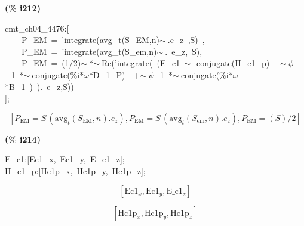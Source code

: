 \documentclass[fleqn]{article}
\begin{document}
\noindent
\begin{minipage}[t]{4.000000em}\color{red}\bfseries
(\% i212)	
\end{minipage}
\begin{minipage}[t]{\textwidth}\color{blue}
cmt\_ch04\_4476:[\\
\ \ \ \ P\_EM\ =\ 'integrate(avg\_t(S\_EM,n)\ensuremath{\sim\ }.e\_z\ ,S)\ ,\ \\
\ \ \ \ P\_EM\ =\ 'integrate(avg\_t(S\_em,n)\ensuremath{\sim\ }.\ e\_z,\ S),\ \\
\ \ \ \ P\_EM\ =\ (1/2)\ensuremath{\sim\ }*\ensuremath{\sim\ }Re('integrate(\ (E\_c1\ \ensuremath{\sim\ }\ conjugate(H\_c1\_p)\ +\ensuremath{\sim\ }\ensuremath{\phi}\_1\ *\ensuremath{\sim\ }conjugate(\%i*\ensuremath{\omega}*D\_1\_P)\ \ +\ensuremath{\sim\ }\ensuremath{\psi}\_1\ *\ensuremath{\sim\ }conjugate(\%i*\ensuremath{\omega}*B\_1\ )\ ).\ e\_z,S))\ \\
];
\end{minipage}
\[\displaystyle \tag{\% o212} 
\operatorname{[}{P_{\ensuremath{\mathrm{EM}}}}=S\, \left( {{\ensuremath{\mathrm{avg}}}_t}\left( {S_{\ensuremath{\mathrm{EM}}}}\operatorname{,}n\right) \ensuremath{\mathrm{ . }}{e_z}\right) \operatorname{,}{P_{\ensuremath{\mathrm{EM}}}}=S\, \left( {{\ensuremath{\mathrm{avg}}}_t}\left( {S_{\ensuremath{\mathrm{em}}}}\operatorname{,}n\right) \ensuremath{\mathrm{ . }}{e_z}\right) \operatorname{,}{P_{\ensuremath{\mathrm{EM}}}}=\left( S \right) /2\operatorname{]}\mbox{}
\]


\noindent
\begin{minipage}[t]{4.000000em}\color{red}\bfseries
(\% i214)	
\end{minipage}
\begin{minipage}[t]{\textwidth}\color{blue}
E\_c1:[Ec1\_x,\ Ec1\_y,\ E\_c1\_z];\ \\
H\_c1\_p:[Hc1p\_x,\ Hc1p\_y,\ Hc1p\_z];
\end{minipage}
\[\displaystyle \tag{\% o213} 
\left[ {{\ensuremath{\mathrm{Ec1}}}_x}\operatorname{,}{{\ensuremath{\mathrm{Ec1}}}_y}\operatorname{,}{{\ensuremath{\mathrm{E\_ c1}}}_z}\right] \mbox{}\]

\[\tag{\% o214} 
\left[ {{\ensuremath{\mathrm{Hc1p}}}_x}\operatorname{,}{{\ensuremath{\mathrm{Hc1p}}}_y}\operatorname{,}{{\ensuremath{\mathrm{Hc1p}}}_z}\right] \mbox{}
\]
\end{document}
